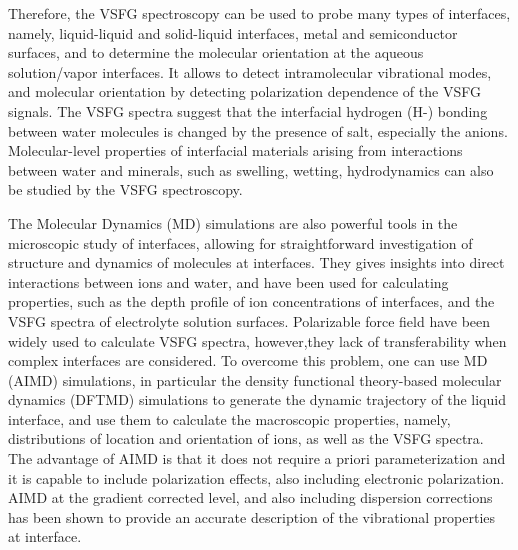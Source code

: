 Therefore, the VSFG spectroscopy can be used to probe many types of interfaces, namely, liquid-liquid and 
solid-liquid interfaces\cite{Guyot-Sionnest1987,RS91,DuQ1993,QD94,Richmond2002,Gopalakrishnan2006,ShenYR2006,Morita2008}, metal and semiconductor surfaces\cite{Harris87,Superfine88},
and to determine the molecular orientation at the aqueous solution/vapor interfaces.
It allows to detect intramolecular vibrational modes, and molecular orientation by detecting polarization dependence of the VSFG signals\cite{Vidal05}.  
The VSFG spectra suggest that the interfacial hydrogen (H-) bonding between water molecules is changed by the presence of salt, 
especially the anions\cite{EAR04}.
Molecular-level properties of interfacial materials arising from interactions between water and minerals, 
such as swelling, wetting, hydrodynamics can also be studied by the VSFG spectroscopy\cite{Rotenberg14}.

The Molecular Dynamics (MD) simulations are also powerful tools in the microscopic study of interfaces,
allowing for straightforward investigation of structure and dynamics of molecules at interfaces\cite{Morita2008}.
They gives insights into direct interactions between ions and water, and have been used for calculating properties, 
such as the depth profile of ion concentrations of interfaces\cite{Jungwirth2001,Jungwirth2002}, and the VSFG spectra 
of electrolyte solution surfaces\cite{Gopalakrishnan2006,Johnson2014,Ishiyama2014,Ishiyama2017}.
Polarizable force field have been widely used to calculate VSFG spectra\cite{LXD03,MKP04,TI07,MM05}, however,they lack
of transferability when complex interfaces are considered.
To overcome this problem, one can use \abinitio MD (AIMD) simulations\cite{CP1985,Pastore1991,Hutter2012}, 
in particular the density functional theory-based molecular dynamics (DFTMD) simulations\cite{CP1985,Nagata2015,Nagata2016,Kuehne2020} to generate the dynamic trajectory of 
the liquid interface, and use them to calculate the macroscopic properties, namely, distributions of location and
orientation of ions, as well as the VSFG spectra\cite{Sulpizi2013,Usui2015,Ohto2015,Khatib2016}.  
The advantage of AIMD is that it does not require a priori parameterization and it is capable to include polarization effects\cite{Ufimtsev2011},
also including electronic polarization. AIMD at the gradient corrected level, and also including dispersion corrections\cite{Grimme2004,Grimme2006,Grimme2007,Grimme2010,Baer2011}
has been shown to provide an accurate description of the vibrational properties at interface\cite{Fornaro2015}.

